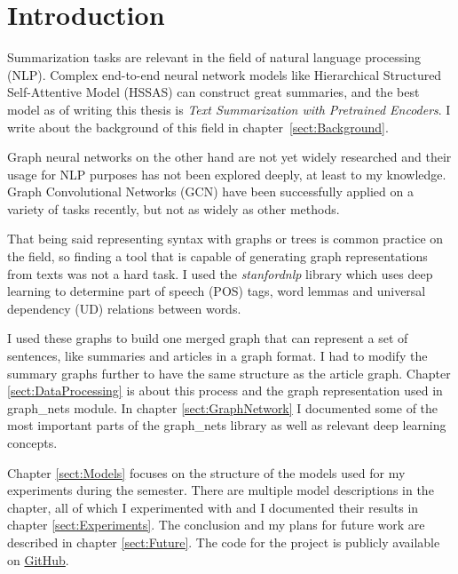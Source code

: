 \chapter*{Introduction}\label{sect:Introduction}

Summarization tasks are relevant in the field of natural language processing (NLP). Complex end-to-end neural network models like Hierarchical Structured Self-Attentive Model (HSSAS) \cite{HSSAS} can construct great summaries, and the best model as of writing this thesis is \textit{Text Summarization with Pretrained Encoders}\cite{BERTsum}. I write about the background of this field in chapter~\ref{sect:Background}.

Graph neural networks on the other hand are not yet widely researched and their usage for NLP purposes has not been explored deeply, at least to my knowledge. Graph Convolutional Networks (GCN) have been successfully applied on a variety of tasks recently, but not as widely as other methods.

That being said representing syntax with graphs or trees is common practice on the field, so finding a tool that is capable of generating graph representations from texts was not a hard task. I used the \textit{stanfordnlp} library which uses deep learning to determine part of speech (POS) tags, word lemmas and universal dependency (UD) relations between words.

I used these graphs to build one merged graph that can represent a set of sentences, like summaries and articles in a graph format. I had to modify the summary graphs further to have the same structure as the article graph. Chapter \ref{sect:DataProcessing} is about this process and the graph representation used in graph\_nets module. In chapter \ref{sect:GraphNetwork} I documented some of the most important parts of the graph\_nets library as well as relevant deep learning concepts.

Chapter \ref{sect:Models} focuses on the structure of the models used for my experiments during the semester. There are multiple model descriptions in the chapter, all of which I experimented with and I documented their results in chapter \ref{sect:Experiments}. The conclusion and my plans for future work are described in chapter \ref{sect:Future}. The code for the project is publicly available on \href{https://github.com/GKingA/graph\_transformations}{GitHub}.